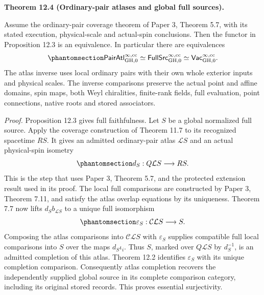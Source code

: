 \documentclass[
  english,
  11pt,
  reqno]{amsart}
\makeatletter
\newcommand{\pandocstatementheading}[1]{%
  \par\if@nobreak\else
    \addpenalty{\@beginparpenalty}%
    \addvspace{.5\baselineskip plus .2\baselineskip minus .2\baselineskip}%
  \fi
  {\normalfont\bfseries #1\par}%
  \nobreak\@afterindenttrue\@afterheading
}
\makeatother
\begin{document}
\pandocstatementheading{\protect{}\label{thm:ordinary-atlas-full-source-equivalence}Theorem 12.4 (Ordinary-pair atlases and global full sources).}

Assume the ordinary-pair coverage theorem of Paper 3, Theorem 5.7, with
its stated execution, physical-scale and actual-spin conclusions. Then
the functor in Proposition 12.3 is an equivalence. In particular there
are equivalences
\begin{equation}\protect\phantomsection\label{eq:ordinary-atlas-global-correspondence}{
\mathsf{PairAtl}^{\infty,\mathrm{cc}}_{\mathrm{GH},0}
\simeq
\mathsf{FullSrc}^{\infty,\mathrm{cc}}_{\mathrm{GH},0}
\simeq
\mathsf{Vac}^{\infty,\mathrm{cc}}_{\mathrm{GH},0}.
}\end{equation} The atlas inverse uses local ordinary pairs with their
own whole exterior inputs and physical scales. The inverse comparisons
preserve the actual point and affine domains, spin maps, both Weyl
chiralities, finite-rank fields, full evaluation, point connections,
native roots and stored associators.

\emph{Proof.} Proposition 12.3 gives full faithfulness. Let \(S\) be a
global normalized full source. Apply the coverage construction of
Theorem 11.7 to its recognized spacetime \(RS\). It gives an admitted
ordinary-pair atlas \(\mathcal L S\) and an actual physical-spin
isometry
\begin{equation}\protect\phantomsection\label{eq:ordinary-atlas-inverse-geometry}{
d_S:Q\mathcal L S\longrightarrow RS.
}\end{equation} This is the step that uses Paper 3, Theorem 5.7, and the
protected extension result used in its proof. The local full comparisons
are constructed by Paper 3, Theorem 7.11, and satisfy the atlas overlap
equations by its uniqueness. Theorem 7.7 now lifts
\(d_S b_{\mathcal L S}\) to a unique full isomorphism
\begin{equation}\protect\phantomsection\label{eq:ordinary-atlas-inverse-counit}{
\varepsilon_S:\mathcal C\mathcal L S\longrightarrow S.
}\end{equation} Composing the atlas comparisons into
\(\mathcal C\mathcal L S\) with \(\varepsilon_S\) supplies compatible
full local comparisons into \(S\) over the maps \(d_S\iota_i\). Thus
\(S\), marked over \(Q\mathcal L S\) by \(d_S^{-1}\), is an admitted
completion of this atlas. Theorem 12.2 identifies \(\varepsilon_S\) with
its unique completion comparison. Consequently atlas completion recovers
the independently supplied global source in its complete comparison
category, including its original stored records. This proves essential
surjectivity.
\end{document}

